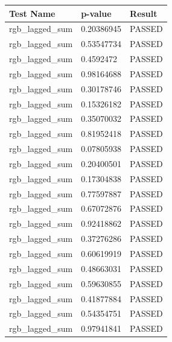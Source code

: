 \documentclass[conference]{IEEEtran}
\begin{document}
\begin{center}
\begin{table}[H]
\renewcommand{\arraystretch}{1.2}
\centering
\begin{tabular}{|l|l|l|}
\hline
Test Name                              & p-value    & Result \\ \hline
rgb\_lagged\_sum                       & 0.20386945 & PASSED \\ \hline
rgb\_lagged\_sum                       & 0.53547734 & PASSED \\ \hline
rgb\_lagged\_sum                       & 0.4592472  & PASSED \\ \hline
rgb\_lagged\_sum                       & 0.98164688 & PASSED \\ \hline
rgb\_lagged\_sum                       & 0.30178746 & PASSED \\ \hline
rgb\_lagged\_sum                       & 0.15326182 & PASSED \\ \hline
rgb\_lagged\_sum                       & 0.35070032 & PASSED \\ \hline
rgb\_lagged\_sum                       & 0.81952418 & PASSED \\ \hline
rgb\_lagged\_sum                       & 0.07805938 & PASSED \\ \hline
rgb\_lagged\_sum                       & 0.20400501 & PASSED \\ \hline
rgb\_lagged\_sum                       & 0.17304838 & PASSED \\ \hline
rgb\_lagged\_sum                       & 0.77597887 & PASSED \\ \hline
rgb\_lagged\_sum                       & 0.67072876 & PASSED \\ \hline
rgb\_lagged\_sum                       & 0.92418862 & PASSED \\ \hline
rgb\_lagged\_sum                       & 0.37276286 & PASSED \\ \hline
rgb\_lagged\_sum                       & 0.60619919 & PASSED \\ \hline
rgb\_lagged\_sum                       & 0.48663031 & PASSED \\ \hline
rgb\_lagged\_sum                       & 0.59630855 & PASSED \\ \hline
rgb\_lagged\_sum                       & 0.41877884 & PASSED \\ \hline
rgb\_lagged\_sum                       & 0.54354751 & PASSED \\ \hline
rgb\_lagged\_sum                       & 0.97941841 & PASSED \\ \hline

\end{tabular}
\end{table}
\end{center}
\end{document}

